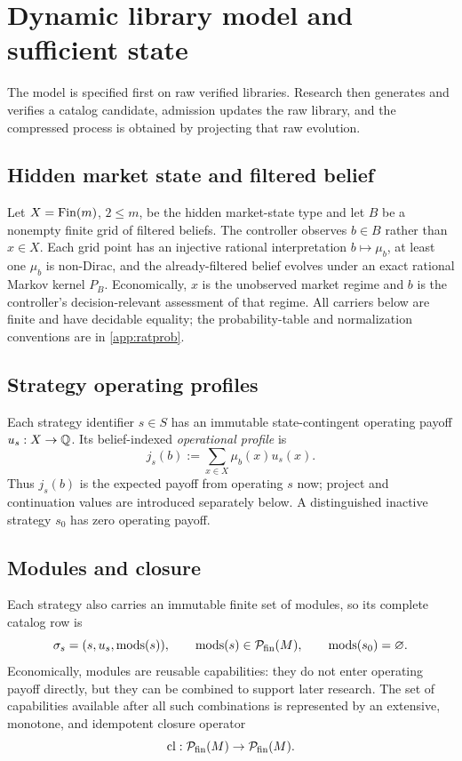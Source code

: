 \section{Dynamic library model and sufficient state}\label{sec:model}

The model is specified first on raw verified libraries.  Research then
generates and verifies a catalog candidate, admission updates the raw library,
and the compressed process is obtained by projecting that raw evolution.

\subsection{Hidden market state and filtered belief}

Let \(X=\operatorname{Fin}(m)\), \(2\le m\), be the hidden market-state type and let \(B\) be
a nonempty finite grid of filtered beliefs.  The controller observes \(b\in B\)
rather than \(x\in X\).  Each grid point has an injective rational
interpretation \(b\mapsto\mu_b\), at least one \(\mu_b\) is non-Dirac, and the
already-filtered belief evolves under an exact rational Markov kernel \(P_B\).
Economically, \(x\) is the unobserved market regime and \(b\) is the
controller's decision-relevant assessment of that regime.  All carriers below
are finite and have decidable equality; the probability-table and
normalization conventions are in \cref{app:ratprob}.

\subsection{Strategy operating profiles}

Each strategy identifier \(s\in S\) has an immutable state-contingent operating
payoff \(u_s:X\to\mathbb{Q}\).  Its belief-indexed \emph{operational profile} is
\begin{equation}\label{eq:operational-profile}
  j_s(b):=\sum_{x\in X}\mu_b(x)u_s(x).
\end{equation}
Thus \(j_s(b)\) is the expected payoff from operating \(s\) now; project and
continuation values are introduced separately below.  A distinguished
inactive strategy \(s_0\) has zero operating payoff.

\subsection{Modules and closure}

Each strategy also carries an immutable finite set of modules, so its complete
catalog row is
\[
  \sigma_s=(s,u_s,\operatorname{mods}(s)),
  \qquad \operatorname{mods}(s)\in\mathcal{P}_{\mathrm{fin}}(M),
  \qquad \operatorname{mods}(s_0)=\varnothing.
\]
Economically, modules are reusable capabilities: they do not enter operating
payoff directly, but they can be combined to support later research.  The set
of capabilities available after all such combinations is represented by an
extensive, monotone, and idempotent closure operator
\[
  \operatorname{cl}:\mathcal{P}_{\mathrm{fin}}(M)\to\mathcal{P}_{\mathrm{fin}}(M).
\]

